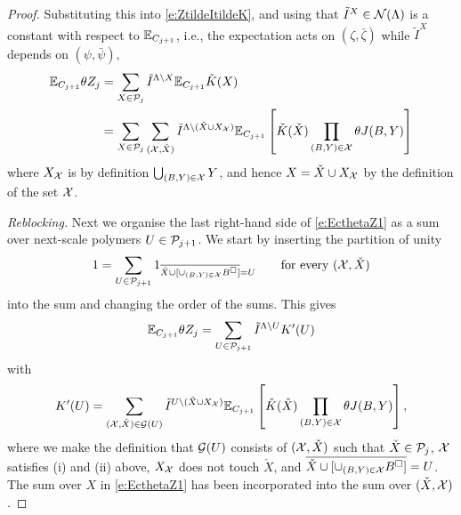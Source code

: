 \documentclass[11pt]{amsart}
\numberwithin{equation}{section}
\numberwithin{theorem}{section}
\newcommand{\1}{{\bf 1}}
\begin{document}
\begin{proof}
Substituting this into \eqref{e:ZtildeItildeK}, and using that $\tilde I^X \in \mathcal N(\Lambda)$ is
a constant with respect to $\mathbb{E}_{C_{j+1}}$,
i.e., the expectation acts on $(\zeta,\bar\zeta)$ while $\tilde I^{X}$ depends on $(\psi,\bar\psi)$,
\begin{align}
    \label{e:EcthetaZ1}
  \mathbb{E}_{C_{j+1}} \theta Z_j
  & = \sum_{X \in \mathcal P_{j}} \tilde I^{\Lambda\setminus X} \mathbb{E}_{C_{j+1}}\tilde K(X)
    \nonumber\\
  &= \sum_{X \in \mathcal P_j}
  \sum_{(\mathcal X,\check{X})}
    \tilde I^{\Lambda\setminus (\check X \cup X_{\mathcal X})}
        \mathbb{E}_{C_{j+1}} \left[{ \check{K}(\check{X})
    \prod_{(B,Y) \in \mathcal X} \theta J(B,Y)}\right]
\end{align}
where $X_{\mathcal X}$ is by definition
$\bigcup_{(B,Y)\in \mathcal X}Y$, and hence $X=\check{X}\cup
X_{\mathcal X}$ by the definition of the set $\mathcal X$.

\smallskip
\noindent\emph{Reblocking.}
Next we organise the last right-hand side of \eqref{e:EcthetaZ1} as a
sum over next-scale polymers $U\in \mathcal P_{j+1}$.  We start by inserting
the partition of unity
\begin{equation}
  1=\sum_{U\in\mathcal P_{j+1}}1_{\overline{\check{X}\cup[\cup_{(B,Y)\in\mathcal X}B^{\square}]}=U}
  \qquad \text{for every $(\mathcal X,\check{X})$}
\end{equation}%
into the sum
and changing the order of the sums. This gives
\begin{equation}
  \mathbb{E}_{C_{j+1}} \theta Z_j
  =
 \sum_{U\in\mathcal P_{j+1}}
 \tilde I^{\Lambda\setminus U}
    K'(U)
\end{equation}
with
\begin{equation}
   K'(U) = \sum_{(\mathcal X,\check{X})\in \mathcal G(U)}
  \tilde I^{U\setminus (\check X \cup X_{\mathcal X})}
      \mathbb{E}_{C_{j+1}} \left[{ \check{K}(\check{X})
  \prod_{(B,Y) \in \mathcal X} \theta J(B,Y) }\right],
\end{equation}
where we make the definition that $\mathcal G(U)$ consists of
$(\mathcal X,\check{X})$ such that $\check{X}\in \mathcal P_{j}$, $\mathcal X$ satisfies
(i) and (ii) above, $X_{\mathcal X}$ does not touch $\check{X}$, and
$\overline{\check X \cup[\cup_{(B,Y)\in\mathcal X}B^\square]}=U$. The sum
over $X$ in \eqref{e:EcthetaZ1} has been incorporated into the sum
over $(\check{X},\mathcal X)$. 


\end{proof}
\end{document}
